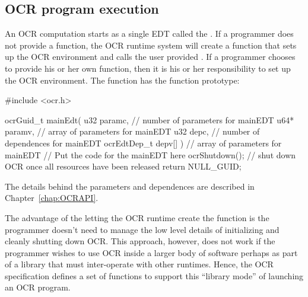 %

\subsection{OCR program execution}
\label{sec:ProgExec}
An OCR computation starts as a single EDT called the .
If a programmer does not provide a  function, the OCR
runtime system will create a  function that sets up the
OCR environment and calls the user provided . If a
programmer chooses to provide his or her own  function,
then it is his or her responsibility to set up the OCR environment.
The  function has the function prototype:
\begin{ocrsnip}
#include <ocr.h>

ocrGuid_t mainEdt(
             u32 paramc,           // number of parameters for mainEDT
             u64* paramv,          // array of parameters for mainEDT
             u32 depc,             // number of dependences for mainEDT
             ocrEdtDep_t depv[] )  // array of parameters for mainEDT
{
    // Put the code for the mainEDT here
    ocrShutdown();         // shut down OCR once all resources have been released
    return NULL_GUID;
}
\end{ocrsnip}
The details behind the parameters and dependences are described in
Chapter~\ref{chap:OCRAPI}.

The advantage of the letting the OCR runtime create the 
function is the programmer doesn't need to manage the low level
details of initializing and cleanly shutting down OCR. This approach,
however, does not work if the programmer wishes to use OCR inside a
larger body of software perhaps as part of a library that must
inter-operate with other runtimes. Hence, the OCR specification
defines a set of functions to support this ``library mode'' of
launching an OCR program.

